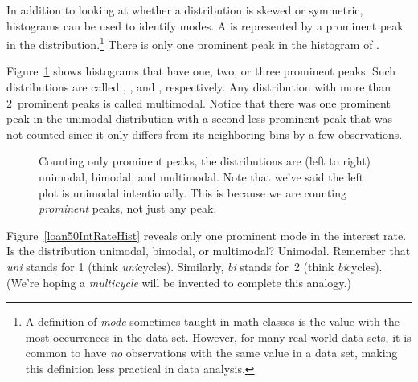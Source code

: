 In addition to looking at whether a distribution is skewed
or symmetric, histograms can be used to identify modes.
A  is represented by a prominent peak in the
distribution.\footnote{A definition of \emph{mode} sometimes
  taught in math classes is the value with the
  most occurrences in the data set.
  However, for many real-world data sets, it is common to have
  \emph{no} observations with the same value in a data set,
  making this definition less practical in data analysis.}
There is only one prominent peak in the histogram of
.

Figure~\ref{singleBiMultiModalPlots} shows histograms that
have one, two, or three prominent peaks.
Such distributions are called
,
, and
, respectively.
Any distribution with more than 2~prominent peaks is
called multimodal.
Notice that there was one prominent peak in the unimodal
distribution with a second less prominent peak that was
not counted since it only differs from its neighboring
bins by a few observations.

\begin{figure}[h]
  \centering
  \caption{Counting only prominent peaks, the
      distributions are (left to right) unimodal,
      bimodal, and multimodal.
      Note that we've said the left plot is unimodal
      intentionally.
      This is because we are counting \emph{prominent}
      peaks, not just any peak.}
  \label{singleBiMultiModalPlots}
\end{figure}

\begin{example}{Figure~\ref{loan50IntRateHist}
    reveals only one prominent mode in the interest rate.
    Is the distribution unimodal, bimodal, or multimodal?}
  Unimodal.
  Remember that \emph{uni} stands for 1 (think \emph{uni}cycles).
  Similarly, \emph{bi} stands for~2 (think \emph{bi}cycles).
  (We're hoping a \emph{multicycle} will be invented to complete
  this analogy.)
\end{example}

